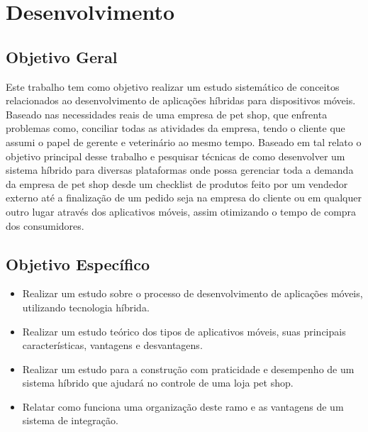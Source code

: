 \documentclass[12pt,openright,twoside,a4paper,english,french,spanish,brazil]{abntex2}
\begin{document}
\chapter*{Desenvolvimento}

\section*{Objetivo Geral}

Este trabalho tem como objetivo realizar um estudo sistemático de conceitos relacionados ao desenvolvimento de aplicações híbridas para dispositivos móveis. Baseado nas necessidades reais de uma empresa de pet shop, que enfrenta problemas como, conciliar todas as atividades da empresa, tendo o cliente que assumi o papel de gerente e veterinário ao mesmo tempo.
Baseado em tal relato o objetivo principal desse trabalho e pesquisar técnicas de como desenvolver um sistema híbrido para diversas plataformas onde possa gerenciar toda a demanda da empresa de pet shop desde um checklist de produtos feito por um vendedor externo até a finalização de um pedido seja na empresa do cliente ou em qualquer outro lugar através dos aplicativos móveis, assim otimizando o tempo de compra dos consumidores.

\section*{Objetivo Específico}
\begin{itemize}
\item Realizar um estudo sobre o processo de desenvolvimento de aplicações móveis, utilizando tecnologia híbrida.
\item Realizar um estudo teórico dos tipos de aplicativos móveis, suas principais características, vantagens e desvantagens.
\item Realizar um estudo para a construção com praticidade e desempenho de um sistema híbrido que ajudará no controle de uma loja pet shop.
\item Relatar como funciona uma organização deste ramo e as vantagens de um sistema de integração.
\end{itemize}
\end{document}

